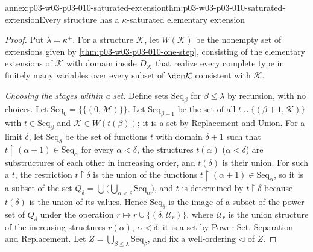 \begin{annexitem}{annex:p03-w03-p03-010-saturated-extension}{thm:p03-w03-p03-010-saturated-extension}{Every structure has a \(\kappa\)-saturated elementary extension}
\begin{proof}
Put \(\lambda=\kappa^+\).  For a structure \(\mathcal K\), let
\(W(\mathcal K)\) be the nonempty set of extensions given by
\cref{thm:p03-w03-p03-010-one-step}, consisting of the elementary extensions
of \(\mathcal K\) with domain inside \(D_{\mathcal K}\) that realize every
complete type in finitely many variables over every subset of
\(\dom\mathcal K\) consistent with \(\mathcal K\).

\emph{Choosing the stages within a set.}  Define sets \(\mathrm{Seq}_\beta\)
for \(\beta\leq\lambda\) by recursion, with no choices.  Let
\(\mathrm{Seq}_0=\{\{(0,\mathcal M)\}\}\).  Let
\(\mathrm{Seq}_{\beta+1}\) be the set of all
\(t\cup\{(\beta+1,\mathcal K)\}\) with \(t\in\mathrm{Seq}_\beta\) and
\(\mathcal K\in W(t(\beta))\); it is a set by Replacement and Union.  For a
limit \(\delta\), let \(\mathrm{Seq}_\delta\) be the set of functions
\(t\) with domain \(\delta+1\) such that
\(t\restriction(\alpha+1)\in\mathrm{Seq}_\alpha\) for every \(\alpha<\delta\),
the structures \(t(\alpha)\) (\(\alpha<\delta\)) are substructures of each
other in increasing order, and \(t(\delta)\) is their union.  For such a
\(t\), the restriction \(t\restriction\delta\) is the union of the
functions \(t\restriction(\alpha+1)\in\mathrm{Seq}_\alpha\), so it is a
subset of the set \(Q_\delta=\bigcup\bigl(\bigcup_{\alpha<\delta}
\mathrm{Seq}_\alpha\bigr)\), and \(t\) is determined by
\(t\restriction\delta\) because \(t(\delta)\) is the union of its values.
Hence \(\mathrm{Seq}_\delta\) is the image of a subset of the power set of
\(Q_\delta\) under the operation
\(r\mapsto r\cup\{(\delta,\mathcal U_r)\}\), where \(\mathcal U_r\) is the
union structure of the increasing structures \(r(\alpha)\),
\(\alpha<\delta\); it is a set by Power Set, Separation and Replacement.  Let
\(Z=\bigcup_{\beta\leq\lambda}\mathrm{Seq}_\beta\), and fix a well-ordering
\(\lhd\) of \(Z\).


\end{proof}
\end{annexitem}
